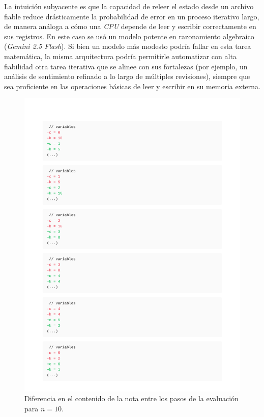 La intuición subyacente es que la capacidad de releer el estado desde un archivo fiable reduce drásticamente la probabilidad de error en un proceso iterativo largo, de manera análoga a cómo una \textit{CPU} depende de leer y escribir correctamente en sus registros. En este caso se usó un modelo potente en razonamiento algebraico (\textit{Gemini 2.5 Flash}). Si bien un modelo más modesto podría fallar en esta tarea matemática, la misma arquitectura podría permitirle automatizar con alta fiabilidad otra tarea iterativa que se alinee con sus fortalezas (por ejemplo, un análisis de sentimiento refinado a lo largo de múltiples revisiones), siempre que sea proficiente en las operaciones básicas de leer y escribir en su memoria externa.

\begin{figure}[h]
    \centering
    \includegraphics[width=1.0\textwidth]{figures/clltz_logs_10.pdf}
    \caption{Diferencia en el contenido de la nota entre los pasos de la evaluación para $n=10$.}
    \label{fig:collatz_diff}
\end{figure}